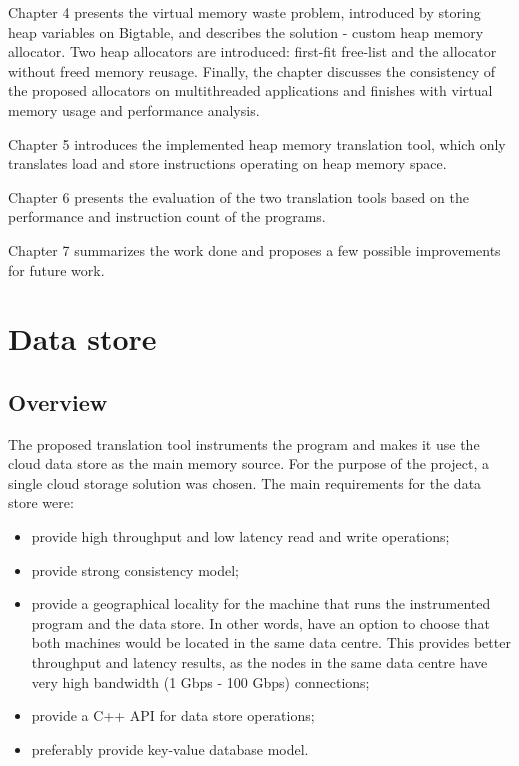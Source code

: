 \documentclass[bsc,frontabs,twoside,singlespacing,parskip,deptreport]{infthesis}     %
\begin{document}
Chapter 4 presents the virtual memory waste problem, introduced by storing heap variables on Bigtable, and describes the solution - custom heap memory allocator. Two heap allocators are introduced: first-fit free-list and the allocator without freed memory reusage. Finally, the chapter discusses the consistency of the proposed allocators on multithreaded applications and finishes with virtual memory usage and performance analysis.

Chapter 5 introduces the implemented heap memory translation tool, which only translates load and store instructions operating on heap memory space.

Chapter 6 presents the evaluation of the two translation tools based on the performance and instruction count of the programs.

Chapter 7 summarizes the work done and proposes a few possible improvements for future work.

\chapter{Data store}

\section{Overview}

The proposed translation tool instruments the program and makes it use the cloud data store as the main memory source. For the purpose of the project, a single cloud storage solution was chosen.
The main requirements for the data store were:

\begin{itemize}
\item
provide high throughput and low latency read and write operations;
\item
provide strong consistency model;
\item
provide a geographical locality for the machine that runs the instrumented program and the data store. In other words, have an option to choose that both machines would be located in the same data centre. This provides better throughput and latency results, as the nodes in the same data centre have very high bandwidth (1 Gbps - 100 Gbps) connections;
\item
provide a C++ API for data store operations;
\item
preferably provide key-value database model.
\end{itemize}
\end{document}
